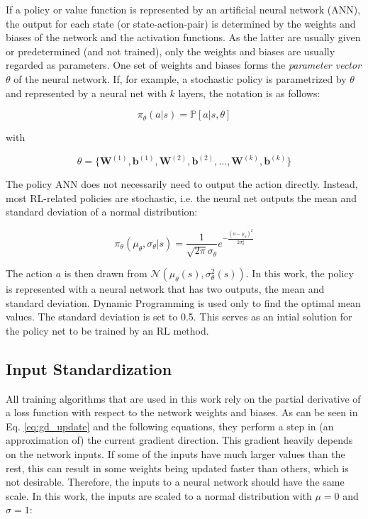 If a policy or value function is represented by an artificial neural network (ANN), the output for each state (or state-action-pair) is determined by the weights and biases of the network and the activation functions. As the latter are usually given or predetermined (and not trained), only the weights and biases are usually regarded as parameters. One set of weights and biases forms the \textit{parameter vector} $\theta$ of the neural network. If, for example, a stochastic policy is parametrized by $\theta$ and represented by a neural net with $k$ layers, the notation is as follows:

\begin{equation}
\pi_\theta(a|s)=\mathbb{P}[a|s,\theta]
\end{equation}

with

\begin{equation}
\theta = \{\boldsymbol{W}^{(1)},\boldsymbol{b}^{(1)},\boldsymbol{W}^{(2)},\boldsymbol{b}^{(2)}, ...,
\boldsymbol{W}^{(k)},\boldsymbol{b}^{(k)}\}
\label{eq:theta}
\end{equation}

The policy ANN does not necessarily need to output the action directly. Instead, most RL-related policies are stochastic, i.e. the neural net outputs the mean and standard deviation of a normal distribution:

\begin{equation}
\pi_\theta(\mu_\theta,\sigma_\theta|s)=\frac{1}{\sqrt{2\pi}\sigma_\theta}e^{-\frac{(a-\mu_\theta)^2}{2\sigma_\theta^2}}
\end{equation}

The action $a$ is then drawn from $\mathcal{N}(\mu_\theta(s),\sigma^2_\theta(s))$. 
In this work, the policy is represented with a neural network that has two outputs, the mean and standard deviation. Dynamic Programming is used only to find the optimal mean values. The standard deviation is set to 0.5. This serves as an intial solution for the policy net to be trained by an RL method.

\subsection*{Input Standardization}

All training algorithms that are used in this work rely on the partial derivative of a loss function with respect to the network weights and biases. As can be seen in Eq. \ref{eq:gd_update} and the following equations, they perform a step in (an approximation of) the current gradient direction. This gradient heavily depends on the network inputs. If some of the inputs have much larger values than the rest, this can result in some weights being updated faster than others, which is not desirable. Therefore, the inputs to a neural network should have the same scale. In this work, the inputs are scaled to a normal distribution with $\mu = 0$ and $\sigma = 1$:

